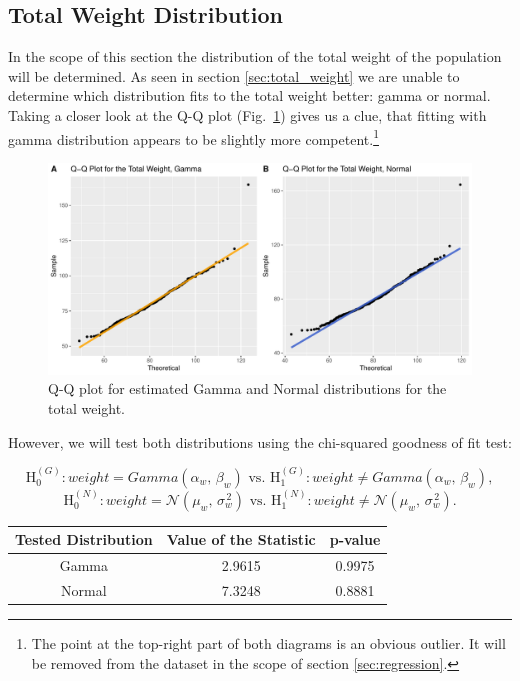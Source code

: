 \documentclass[11pt,american,american]{article}
\begin{document}
\subsection{Total Weight Distribution}

In the scope of this section the distribution of the total weight of the population will be determined. As seen in section \ref{sec:total_weight} we are unable to determine which distribution fits to the total weight better: gamma or normal. Taking a closer look at the Q-Q plot (Fig.~\ref{fig:qq_total_weight}) gives us a clue, that fitting with gamma distribution appears to be slightly more competent.\footnote{The point at the top-right part of both diagrams is an obvious outlier. It will be removed from the dataset in the scope of section \ref{sec:regression}.} 

\begin{figure}[H]
	\centering
	\includegraphics[width=0.9\linewidth]{Images/FIGURES/qq_total_weight}
	\caption{Q-Q plot for estimated Gamma and Normal distributions for the total weight.}
	\label{fig:qq_total_weight}
\end{figure}

However, we will test both distributions using the chi-squared goodness of fit test:

\begin{equation*}
\text{H}_{0}^{(G)}: weight = Gamma(\alpha_{w}, \, \beta_{w}) \text{ vs. }
\text{H}_{1}^{(G)}: weight \neq Gamma(\alpha_{w}, \, \beta_{w}),
\end{equation*}
\begin{equation*}
\text{H}_{0}^{(N)}: weight = \mathcal{N} (\mu_{w},\,\sigma^{\,2}_{w}) \text{ vs. }
\text{H}_{1}^{(N)}: weight \neq \mathcal{N} (\mu_{w},\,\sigma^{\,2}_{w}).
\end{equation*}

\begin{table}[ht!]
	\centering
	\begin{tabular}{|c||c|c|}
		\hline 
		Tested Distribution & Value of the Statistic & p-value \\ 
		\hline \hline
		Gamma & 2.9615 & 0.9975 \\ 
		\hline
		Normal & 7.3248 & 0.8881 \\ 
		\hline
	
	\end{tabular} 
\end{table}
\end{document}
